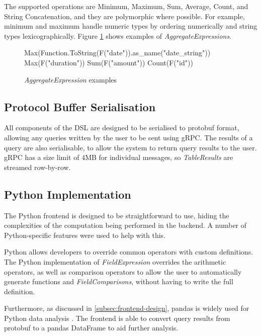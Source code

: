 The supported operations are Minimum, Maximum, Sum, Average, Count, and String Concatenation, and they are polymorphic where possible. For example, minimum and maximum handle numeric types by ordering numerically and string types lexicographically. Figure \ref{fig:aggregate-expressions-examples} shows examples of \textit{AggregateExpressions}.

\begin{figure}[htp]
	\begin{python}
Max(Function.ToString(F("date")).as_name("date_string"))
Max(F("duration"))
Sum(F("amount"))
Count(F("id"))
	\end{python}
	\caption{\textit{AggregateExpression} examples}
	\label{fig:aggregate-expressions-examples}
\end{figure}

\subsection{Protocol Buffer Serialisation}
All components of the DSL are designed to be serialised to protobuf format, allowing any queries written by the user to be sent using gRPC. The results of a query are also serialisable, to allow the system to return query results to the user. gRPC has a size limit of 4MB for individual messages, so \textit{TableResults} are streamed row-by-row.

\subsection{Python Implementation}\label{subsec:dsl-python}
The Python frontend is designed to be straightforward to use, hiding the complexities of the computation being performed in the backend. A number of Python-specific features were used to help with this.

Python allows developers to override common operators with custom definitions. The Python implementation of \textit{FieldExpression} overrides the arithmetic operators, as well as comparison operators to allow the user to automatically generate functions and \textit{FieldComparisons}, without having to write the full definition. %

Furthermore, as discussed in \ref{subsec:frontend-design}, pandas is widely used for Python data analysis \cite{reback2020pandas}. The frontend is able to convert query results from protobuf to a pandas DataFrame to aid further analysis.



